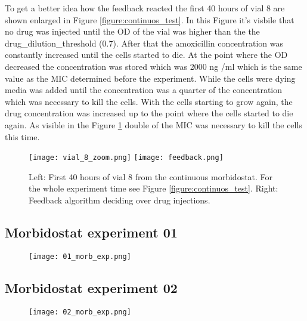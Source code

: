 To get a better idea how the feedback reacted the first 40 hours of vial 8 are shown enlarged in Figure \ref{figure:continuos_test}. In this Figure it's visbile that no drug was injected until the OD of the vial was higher than the the drug\_dilution\_threshold (0.7). After that the amoxicillin concentration was constantly increased until the cells started to die. At the point where the OD decreased the concentration was stored which was 2000 ng \textmu /ml which is the same value as the MIC determined before the experiment. While the cells were dying media was added until the concentration was a quarter of the concentration which was necessary to kill the cells. With the cells starting to grow again, the drug concentration was increased up to the point where the cells started to die again. As visible in the Figure \ref{figure:vial8_zoom} double of the MIC was necessary to kill the cells this time.  
\begin{figure}
	\texttt{[image: vial\_8\_zoom.png]}
	\texttt{[image: feedback.png]}
	\caption{Left: First 40 hours of vial 8 from the continuous morbidostat. For the whole experiment time see Figure \ref{figure:continuos_test}. Right: Feedback algorithm deciding over drug injections. }
	\label{figure:vial8_zoom}
\end{figure}

\subsection{Morbidostat experiment 01}
\begin{figure}[H]
	\texttt{[image: 01\_morb\_exp.png]}
\end{figure}


\subsection{Morbidostat experiment 02}
\begin{figure}[H]
	\texttt{[image: 02\_morb\_exp.png]}
\end{figure}